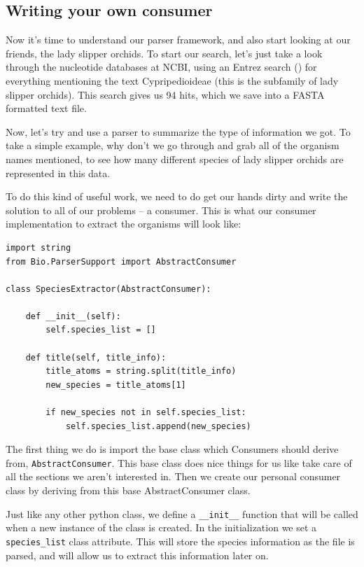 \documentclass{report}
\begin{document}
\subsection{Writing your own consumer}
\label{sec:writing_consumer}

Now it's time to understand our parser framework, and also start looking at our friends, the lady slipper orchids. To start our search, let's just take a look through the nucleotide databases at NCBI, using an Entrez search () for everything mentioning the text Cypripedioideae (this is the subfamily of lady slipper orchids). This search gives us 94 hits, which we save into a FASTA formatted text file.


Now, let's try and use a parser to summarize the type of information we got. To take a simple example, why don't we go through and grab all of the organism names mentioned, to see how many different species of lady slipper orchids are represented in this data.


To do this kind of useful work, we need to do get our hands dirty and write the solution to all of our problems -- a consumer. This is what our consumer implementation to extract the organisms will look like:

\begin{verbatim}
import string
from Bio.ParserSupport import AbstractConsumer

class SpeciesExtractor(AbstractConsumer):

    def __init__(self):
        self.species_list = []

    def title(self, title_info):
        title_atoms = string.split(title_info)
        new_species = title_atoms[1]

        if new_species not in self.species_list:
            self.species_list.append(new_species)
\end{verbatim}

The first thing we do is import the base class which Consumers should derive from, \verb|AbstractConsumer|. This base class does nice things for us like take care of all the sections we aren't interested in. Then we create our personal consumer class by deriving from this base AbstractConsumer class.


Just like any other python class, we define a \verb|__init__| function that will be called when a new instance of the class is created. In the initialization we set a \verb|species_list| class attribute. This will store the species information as the file is parsed, and will allow us to extract this information later on.
\end{document}
